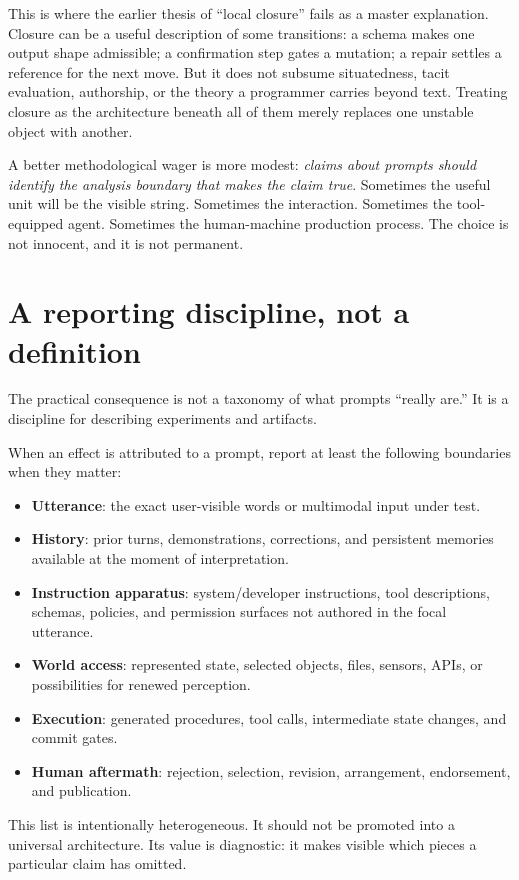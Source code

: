 \documentclass[11pt]{article}
\begin{document}
This is where the earlier thesis of “local closure” fails as a master explanation. Closure can be a useful description of some transitions: a schema makes one output shape admissible; a confirmation step gates a mutation; a repair settles a reference for the next move. But it does not subsume situatedness, tacit evaluation, authorship, or the theory a programmer carries beyond text. Treating closure as the architecture beneath all of them merely replaces one unstable object with another.

A better methodological wager is more modest: \emph{claims about prompts should identify the analysis boundary that makes the claim true}. Sometimes the useful unit will be the visible string. Sometimes the interaction. Sometimes the tool-equipped agent. Sometimes the human-machine production process. The choice is not innocent, and it is not permanent.

\section{A reporting discipline, not a definition}
The practical consequence is not a taxonomy of what prompts “really are.” It is a discipline for describing experiments and artifacts.

When an effect is attributed to a prompt, report at least the following boundaries when they matter:

\begin{itemize}
\item \textbf{Utterance}: the exact user-visible words or multimodal input under test.
\item \textbf{History}: prior turns, demonstrations, corrections, and persistent memories available at the moment of interpretation.
\item \textbf{Instruction apparatus}: system/developer instructions, tool descriptions, schemas, policies, and permission surfaces not authored in the focal utterance.
\item \textbf{World access}: represented state, selected objects, files, sensors, APIs, or possibilities for renewed perception.
\item \textbf{Execution}: generated procedures, tool calls, intermediate state changes, and commit gates.
\item \textbf{Human aftermath}: rejection, selection, revision, arrangement, endorsement, and publication.
\end{itemize}

This list is intentionally heterogeneous. It should not be promoted into a universal architecture. Its value is diagnostic: it makes visible which pieces a particular claim has omitted.
\end{document}
